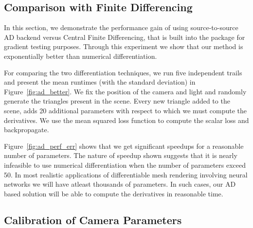 \documentclass{juliacon}
\begin{document}
\subsection{Comparison with Finite Differencing}
\label{sec:finite_diff}

In this section, we demonstrate the performance gain of using source-to-source AD backend versus Central Finite Differencing, that is built into the package for gradient testing purposes. Through this experiment we show that our method is exponentially better than numerical differentiation.

For comparing the two differentiation techniques, we run five independent trails and present the mean runtimes (with the standard deviation) in Figure~\ref{fig:ad_better}. We fix the position of the camera and light and randomly generate the triangles present in the scene. Every new triangle added to the scene, adds 20 additional parameters with respect to which we must compute the derivatives. We use the mean squared loss function to compute the scalar loss and backpropagate.

Figure~\ref{fig:ad_perf_err} shows that we get significant speedups for a reasonable number of parameters. The nature of speedup shown suggests that it is nearly infeasible to use numerical differentiation when the number of parameters exceed 50. In most realistic applications of differentiable mesh rendering involving neural networks we will have atleast thousands of parameters. In such cases, our AD based solution will be able to compute the derivatives in reasonable time.

\subsection{Calibration of Camera Parameters}
\label{sec:calcam}
\end{document}

